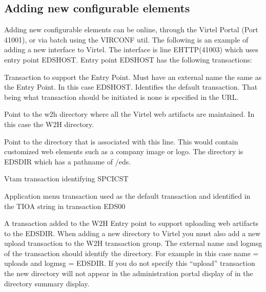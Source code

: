 \documentclass[letterpaper,10pt,english]{sphinxmanual}
\begin{document}
\subsection{Adding new configurable elements}
\label{\detokenize{connectivity_guide:adding-new-configurable-elements}}
\sphinxAtStartPar
Adding new configurable elements can be online, through the Virtel Portal (Port 41001), or via batch using the VIRCONF util. The following is an example of adding a new interface to Virtel. The interface is line E\sphinxhyphen{}HTTP(41003) which uses entry point EDSHOST. Entry point EDSHOST has the following transactions:\sphinxhyphen{}
\begin{description}
\sphinxAtStartPar
Transaction to support the Entry Point. Must have an external name the same as the Entry Point. In this case EDSHOST. Identifies the default transaction. That being what transaction should be initiated is none is specified in the URL.

\sphinxAtStartPar
Point to the w2h directory where all the Virtel web artifacts are maintained. In this case the W2H directory.

\sphinxAtStartPar
Point to the directory that is associated with this line. This would contain customized web elements such as a company image or logo. The directory is EDS\sphinxhyphen{}DIR which has a pathname of /eds.

\sphinxAtStartPar
Vtam transaction identifying SPCICST

\sphinxAtStartPar
Application menu transaction used as the default transaction and identified in the TIOA string in transaction EDS\sphinxhyphen{}00

\sphinxAtStartPar
A transaction added to the W2H Entry point to support uploading web artifacts to the EDS\sphinxhyphen{}DIR. When adding a new directory to Virtel you must also add a new upload transaction to the W2H transaction group. The external name and logmsg of the transaction should identify the directory. For example in this case name = uploads and logmsg = EDS\sphinxhyphen{}DIR. If you do not specify this “upload” transaction the new directory will not appear in the administration portal display of in the directory summary display.

\end{description}
\end{document}

